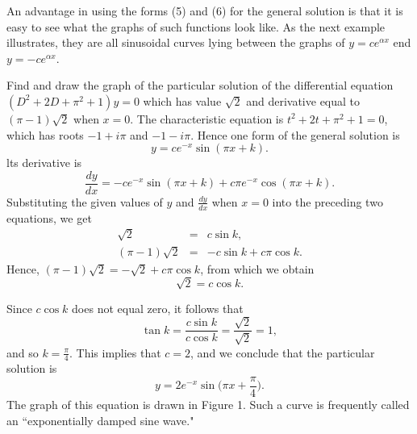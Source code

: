 An advantage in using the forms (5) and (6) for the general solution is that it is easy to see what the graphs of such functions look like. As the next example illustrates, they are all sinusoidal curves lying between the graphs of $y= ce^{\alpha x}$ end $y= -ce^{\alpha x}$.


\begin{example} Find and draw the graph of the particular solution of the differential equation $(D^2 + 2D + \pi^2 + 1)y = 0$ which has value $\sqrt 2$ and derivative equal to $(\pi - 1) \sqrt 2$ when $x= 0$. The characteristic equation is $t^2 + 2t + \pi^2 + 1 = 0$, which has roots $-1 + i\pi$ and $-1 - i\pi$. Hence one form of the general solution is 
$$
y = ce^{-x} \sin(\pi x + k). 
$$
lts derivative is 
$$
\frac{dy}{dx} = -ce^{-x} \sin(\pi x + k) + c \pi e^{-x} \cos(\pi x + k).
$$
Substituting the given values of $y$ and $\frac{dy}{dx}$ when $x = 0$ into the preceding two equations, we get  
\begin{eqnarray*}
\sqrt 2 &=& c \sin k,\\
(\pi - 1)\sqrt 2 &=& -c \sin k + c \pi \cos k.
\end{eqnarray*}
Hence, $(\pi - 1)\sqrt 2 = -\sqrt 2 + c\pi \cos k$, from which we obtain
$$
\sqrt 2 = c \cos k. 
$$

\noindent Since $c \cos k$ does not equal zero, it follows that
$$
\tan k = \frac{c \sin k}{c \cos k} =  \frac{\sqrt 2}{\sqrt 2} =  1,
$$
and so $k = \frac{\pi}{4}$. This implies that $c = 2$, and we conclude that the particular solution is 
$$
y = 2e^{-x} \sin \Big(\pi x + \frac{\pi}{4} \Big) .
$$
The graph of this equation is drawn in Figure 1. Such a curve is frequently called an ``exponentially damped sine wave."
\end{example}
